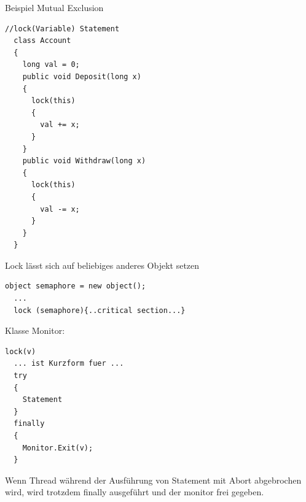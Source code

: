 Beispiel Mutual Exclusion 
\begin{lstlisting}[style=C]
  //lock(Variable) Statement
  class Account
  {
    long val = 0; 
    public void Deposit(long x)
    {
      lock(this)
      {
        val += x; 
      }
    }
    public void Withdraw(long x)
    {
      lock(this)
      {
        val -= x; 
      }
    }
  }
\end{lstlisting} 
Lock lässt sich auf beliebiges anderes Objekt setzen
\begin{lstlisting}[style=C]
  object semaphore = new object(); 
  ...
  lock (semaphore){..critical section...}
\end{lstlisting} 
Klasse Monitor:\\
\begin{lstlisting}[style=C]
  lock(v) 
  ... ist Kurzform fuer ...
  try
  {
    Statement
  }
  finally
  {
    Monitor.Exit(v); 
  }
\end{lstlisting} 
Wenn Thread während der Ausführung von Statement mit Abort abgebrochen wird,
wird trotzdem finally ausgeführt und der monitor frei gegeben.\\

